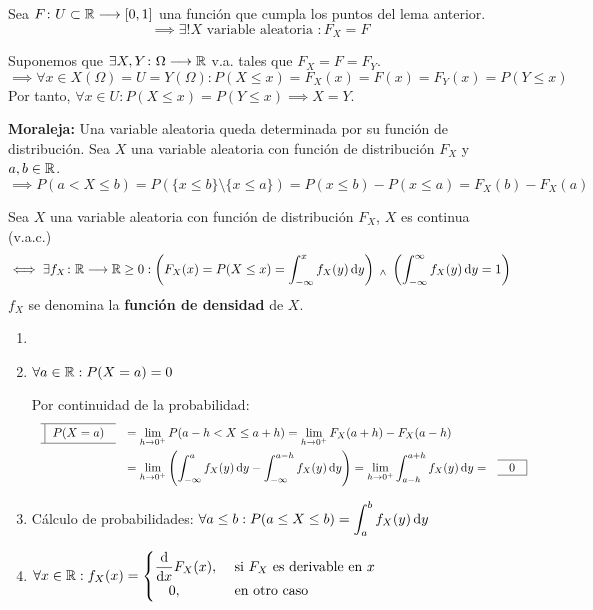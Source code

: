 \begin{teo}
	Sea $F \colon U \subset \mathbb{R} \longrightarrow [0, 1]$ una función que cumpla los puntos del lema anterior.
	\[\implies \exists! X \text{ variable aleatoria } : F_X = F\]
	\begin{dem}
		Suponemos que $\exists X, Y \colon \Omega \longrightarrow \mathbb{R}$ v.a. tales que $F_X = F = F_Y$.
		\[\implies \forall x \in X(\Omega) = U = Y(\Omega) : P(X \leq x) = F_X(x) = F(x) = F_Y(x) = P(Y \leq x)\]
		Por tanto, $\forall x \in U : P(X\leq x) = P(Y\leq x) \implies X = Y$.
	\end{dem}
\end{teo}
\textbf{Moraleja:} Una variable aleatoria queda determinada por su función de distribución.
Sea $X$ una variable aleatoria con función de distribución $F_X$ y $a,b\in \mathbb{R}$.
\[\implies P(a<X\leq b)=P(\{x\leq b\}\setminus \{x\leq a\}) = P(x\leq b) - P(x\leq a) = F_X(b)-F_X(a)\]
\vspace{-0.8cm}
\begin{defn}
	Sea $X$ una variable aleatoria con función de distribución $F_X$, $X$ es continua (v.a.c.)
	\[\iff \exists \appl{f_X}{\R}{\R} \geq 0 : \left(F_X(x) = P(X\leq x)=\int_{-\infty}^{x} f_X(y) \odif{y}\right) \we \left(\int_{-\infty}^{\infty} f_X(y) \odif{y}=1\right)\]
	$f_X$ se denomina la \textbf{función de densidad} de $X$.
\end{defn}

\begin{obs}
	\begin{enumerate}[topsep=1pt, itemsep=1pt,parsep=3pt]
		\item[]
		\item $\forall a \in \mathbb{R} : P(X=a) = 0$
		      \begin{dem}
			      Por continuidad de la probabilidad:
			      \[\begin{aligned}
					      \lbox{P(X=a)} & =\lim_{h \to 0^+} P(a-h<X\leq a+h) = \lim_{h\to0^+} F_X(a+h)-F_X(a-h)                                                                                                  \\
					                    & = \lim_{h \to 0^+} \left(\int_{-\infty}^{a} f_X(y) \odif{y} - \int_{-\infty}^{a-h} f_X(y) \odif{y}\right) = \lim_{h\to0^+} \int_{a-h}^{a+h} f_X(y) \odif{y} = \rbox{0}
				      \end{aligned}\]
		      \end{dem}
		\item Cálculo de probabilidades: $\ds\forall a \leq b : P(a\leq X\leq b) = \int_{a}^{b} f_X(y) \odif{y}$
		\item $\ds \forall x \in \R : f_X(x) = \begin{cases}
				      \ds \odv{}{x} F_X(x), & \text{ si } F_X \text{ es derivable en } x \\
				      \ds \quad 0,          & \text{ en otro caso}
			      \end{cases}$
	\end{enumerate}
\end{obs}

